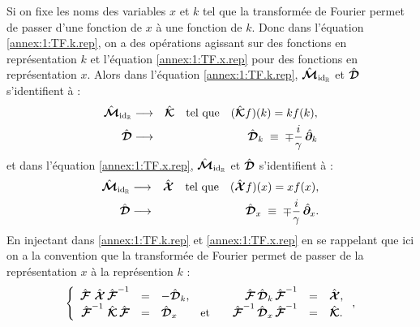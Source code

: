 Si on fixe les noms des variables \guillemotleft{}$x$\guillemotright{} et \guillemotleft{}$k$\guillemotright{} tel que la transformée de Fourier permet de passer d'une fonction de \guillemotleft{}$x$\guillemotright{} à une fonction de \guillemotleft{}$k$\guillemotright{}. Donc dans l'équation \eqref{annex:1:TF.k.rep}, on a des opérations agissant sur des fonctions en représentation \guillemotleft{}$k$\guillemotright{} et l'équation \eqref{annex:1:TF.x.rep} pour des fonctions en représentation \guillemotleft{}$x$\guillemotright{}.  Alors dans l'équation \eqref{annex:1:TF.k.rep}, $\hat{\bm{\mathcal M}}_{\mathrm{id}_{\mathbb R}}$ et $\hat{\bm{\mathcal{D}}}$   s'identifient  à :
\begin{eqnarray}
\hat{\bm{\mathcal M}}_{\mathrm{id}_{\mathbb R}} & \longrightarrow &  \hat{\bm{\mathcal{K}}} \quad \mbox{tel que} \quad 
(\hat{\bm{\mathcal{K}}} f)(k) = k f(k),\\
\hat{\bm{\mathcal{D}}} & \longrightarrow &  \hat{\bm{\mathcal{D}}}_k \; \equiv\; \mp \frac{i}{\gamma}\,\hat{\bm{\partial}}_k  
\end{eqnarray}
et dans l'équation \eqref{annex:1:TF.x.rep}, $\hat{\bm{\mathcal M}}_{\mathrm{id}_{\mathbb R}}$ et $\hat{\bm{\mathcal{D}}}$ s'identifient à  :
\begin{eqnarray}
\hat{\bm{\mathcal M}}_{\mathrm{id}_{\mathbb R}} & \longrightarrow&  \hat{\bm{\mathcal{X}}} \quad \mbox{tel que} \quad 
(\hat{\bm{\mathcal{X}}} f)(x) = x f(x),\\
\hat{\bm{\mathcal{D}}} & \longrightarrow &  \hat{\bm{\mathcal{D}}}_x \; \equiv\; \mp \frac{i}{\gamma}\,\hat{\bm{\partial}}_x.
\end{eqnarray}
En injectant dans \eqref{annex:1:TF.k.rep} et  \eqref{annex:1:TF.x.rep}  en se rappelant que ici on a la convention que la transformée de Fourier permet de passer de la représentation \guillemotleft{}$x$\guillemotright{} à la représention \guillemotleft{}$k$\guillemotright{} :
\begin{eqnarray}
    \left \{ 
        \begin{array}{rclcrlc}  
            \hat{\bm{\mathcal F}} \, \,  \hat{\bm{\mathcal X}} \, \hat{\bm{\mathcal{F}}}^{-1} &  =  &-\hat{\bm{\mathcal{D}}}_k, &&\hat{\bm{\mathcal{F}}}\, \hat{\bm{\mathcal{D}}}_k \, \hat{\bm{\mathcal{F}}}^{-1} &= &  \hat{\bm{\mathcal X}}, \\  \hat{\bm{\mathcal{F}}}^{-1} \, \,  \hat{\bm{\mathcal{K}}}  \, \hat{\bm{\mathcal{F}}}  & =  & \hat{\bm{\mathcal D}}_x  &\mbox{et} &  \quad   \hat{\bm{\mathcal{F}}}^{-1}\, \hat{\bm{\mathcal D}}_x\, \hat{\bm{\mathcal{F}}}^{-1} & =&  \hat{\bm{\mathcal{K}}}.
        \end{array} 
        \right . ,
\end{eqnarray} 
